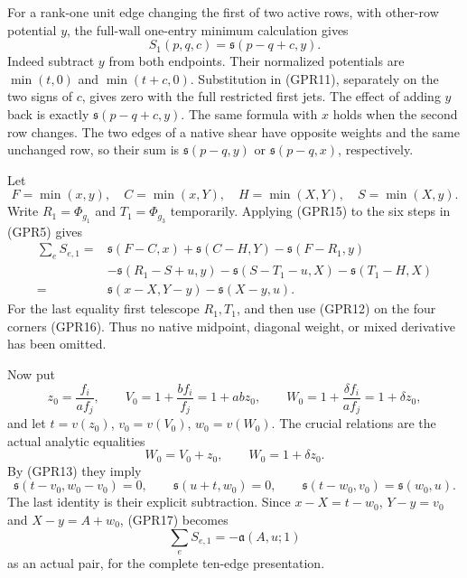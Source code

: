 For a rank-one unit edge changing the first of two active rows,
with other-row potential $y$, the full-wall one-entry minimum
calculation gives
\[
 S_1(p,q,c)=\mathfrak s(p-q+c,y).
 \tag{GPR15}
\]
Indeed subtract $y$ from both endpoints.  Their normalized
potentials are $\min(t,0)$ and $\min(t+c,0)$.  Substitution
in (GPR11), separately on the two signs of $c$, gives zero with
the full restricted first jets.  The effect of adding $y$ back
is exactly $\mathfrak s(p-q+c,y)$.  The same formula with
$x$ holds when the second row changes.  The two edges of a
native shear have opposite weights and the same unchanged row,
so their sum is $\mathfrak s(p-q,y)$ or
$\mathfrak s(p-q,x)$, respectively.

Let
\[
 F=\min(x,y),\quad C=\min(x,Y),\quad H=\min(X,Y),
 \quad S=\min(X,y).
 \tag{GPR16}
\]
Write $R_1=\Phi_{g_1}$ and $T_1=\Phi_{g_3}$ temporarily.
Applying (GPR15) to the six steps in (GPR5) gives
\[
\begin{split}
 \sum_eS_{e,1}={}&\mathfrak s(F-C,x)+\mathfrak s(C-H,Y)
       -\mathfrak s(F-R_1,y)\\
 &-\mathfrak s(R_1-S+u,y)
       -\mathfrak s(S-T_1-u,X)-\mathfrak s(T_1-H,X)\\
 ={}&\mathfrak s(x-X,Y-y)-\mathfrak s(X-y,u).
\end{split}
\tag{GPR17}
\]
For the last equality first telescope $R_1,T_1$, and then use
(GPR12) on the four corners (GPR16).  Thus no native midpoint,
diagonal weight, or mixed derivative has been omitted.

Now put
\[
 z_0=\frac{f_i}{a f_j},\qquad
 V_0=1+\frac{bf_i}{f_j}=1+abz_0,\qquad
 W_0=1+\frac{\delta f_i}{a f_j}=1+\delta z_0,
 \tag{GPR18}
\]
and let $t=v(z_0)$, $v_0=v(V_0)$, $w_0=v(W_0)$.
The crucial relations are the actual analytic equalities
\[
                         W_0=V_0+z_0,
                 \qquad W_0=1+\delta z_0.
 \tag{GPR19}
\]
By (GPR13) they imply
\[
 \mathfrak s(t-v_0,w_0-v_0)=0,\qquad
 \mathfrak s(u+t,w_0)=0,
 \qquad
 \mathfrak s(t-w_0,v_0)=\mathfrak s(w_0,u).
 \tag{GPR20}
\]
The last identity is their explicit subtraction.  Since
$x-X=t-w_0$, $Y-y=v_0$ and $X-y=A+w_0$, (GPR17) becomes
\[
                  \sum_e S_{e,1}=-\mathfrak a(A,u;1)
 \tag{GPR21}
\]
as an actual pair, for the complete ten-edge presentation.

